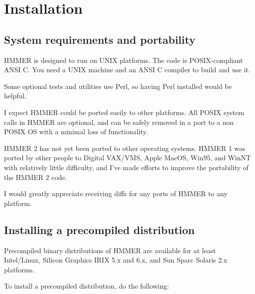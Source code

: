 \chapter{Installation}

\section{System requirements and portability}

HMMER is designed to run on UNIX platforms. The code is
POSIX-compliant ANSI C.  You need a UNIX machine and an ANSI C
compiler to build and use it.

Some optional tests and utilities use Perl, so having Perl installed
would be helpful.

I expect HMMER could be ported easily to other platforms. All POSIX
system calls in HMMER are optional, and can be safely removed in a
port to a non POSIX OS with a minimal loss of functionality. 

HMMER 2 has not yet been ported to other operating systems.  HMMER 1
was ported by other people to Digital VAX/VMS, Apple MacOS, Win95, and
WinNT with relatively little difficulty, and I've made efforts to
improve the portability of the HMMER 2 code.

I would greatly appreciate receiving diffs for any ports of HMMER to
any platform.

\section{Installing a precompiled distribution}

Precompiled binary distributions of HMMER are available for at least
Intel/Linux, Silicon Graphics IRIX 5.x and 6.x, and Sun Sparc Solaris
2.x platforms.

To install a precompiled distribution, do the following:

